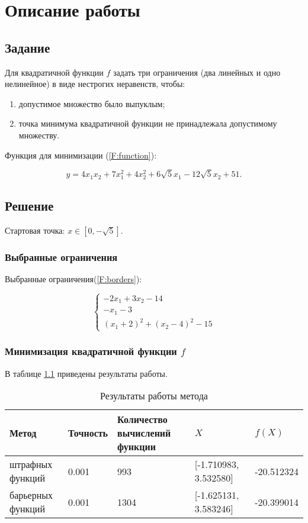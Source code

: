 \chapter{Описание работы}
\section{Задание}
Для квадратичной функции $f$ задать три ограничения (два линейных и одно нелинейное) в
виде нестрогих неравенств, чтобы:

\begin{enumerate}
	\item допустимое множество было выпуклым;
	\item точка минимума квадратичной функции не принадлежала допустимому множеству.
\end{enumerate}

Функция для минимизации (\eqref{F:function}):

\begin{equation}
y=4 x_{1} x_{2} + 7x_1^2 + 4x_2^2 + 6 \sqrt{5}x_1 -12\sqrt{5}x_2 + 51.
\label{F:function}
\end{equation}

\section{Решение}

Стартовая точка: $x\in [0,-\sqrt{5}]$.

\subsection{Выбранные ограничения}
Выбранные ограничения(\eqref{F:borders}): 

\begin{equation}
\left\{\begin{matrix}
-2x_1+3x_2-14
\\ -x_1-3
\\ (x_1+2)^2+(x_2-4)^2-15
\end{matrix}\right.
\label{F:borders}
\end{equation}

\subsection{Минимизация квадратичной функции $f$}
В таблице \ref{tb:tab1} приведены результаты работы.

\begin{table}[!ht]
\caption{Результаты работы метода}
\begin{tabular}{|p{}|p{}|p{}|p{}|p{}|}
\hline
Метод & Точность& Количество вычислений функции & $X$ & $f(X)$\\
\hline
штрафных функций & 0.001 & 993 & [-1.710983, 3.532580] & -20.512324\\
\hline
барьерных функций & 0.001 & 1304 & [-1.625131, 3.583246] & -20.399014\\
\hline
\end{tabular}
\label{tb:tab1}
\end{table}


%
%

